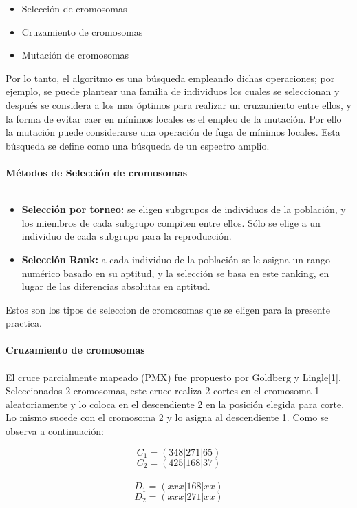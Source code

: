 \documentclass[10pt,letterpaper]{article}
\begin{document}
\begin{itemize}
\item Selección de cromosomas
\item Cruzamiento de cromosomas
\item Mutación de cromosomas
\end{itemize}

Por lo tanto, el algoritmo es una búsqueda empleando dichas operaciones; por ejemplo, se puede plantear una familia de individuos los cuales se seleccionan y después se considera a los mas óptimos para realizar un cruzamiento entre ellos, y la forma de evitar caer en mínimos locales es el empleo de la mutación. Por ello la mutación puede considerarse una operación de fuga de mínimos locales. Esta búsqueda se define como una búsqueda de un espectro amplio.
\\\\
\textbf{\large Métodos de Selección de cromosomas}
\\\\
\begin{itemize}
\item \textbf{Selección por torneo:} se eligen subgrupos de individuos de la población, y los miembros de cada subgrupo compiten entre ellos. Sólo se elige a un individuo de cada subgrupo para la reproducción.

\item \textbf{Selección Rank:} a cada individuo de la población se le asigna un rango numérico basado en su aptitud, y la selección se basa en este ranking, en lugar de las diferencias absolutas en aptitud. 

\end{itemize}

Estos son los tipos de seleccion de cromosomas que se eligen para la presente practica.
\\\\
\hrulefill \textbf{\large Cruzamiento de cromosomas}
\\\\
El cruce parcialmente mapeado (PMX) fue propuesto por Goldberg y Lingle[1]. Seleccionados 2 cromosomas, este cruce realiza 2 cortes en el cromosoma 1 aleatoriamente y lo coloca en el descendiente 2 en la posición elegida para corte. Lo mismo sucede con el cromosoma 2 y lo asigna al descendiente 1. Como se observa a continuación:

\[C_1 = ( 3 4 8 | 2 7 1 | 6 5 )\]
\[C_2 = ( 4 2 5 | 1 6 8 | 3 7 )\]\\
\[D_1 = ( x x x | 1 6 8 | x x )\]
\[D_2 = ( x x x | 2 7 1 | x x )\]
\end{document}
